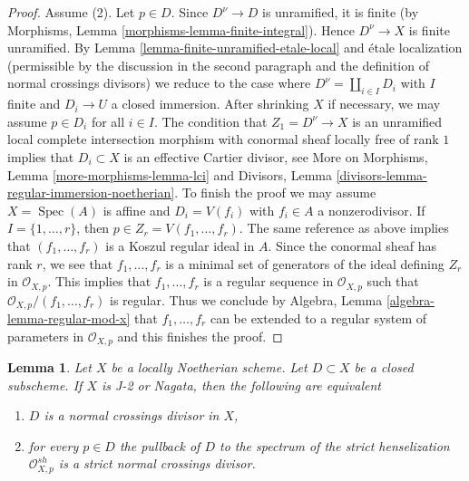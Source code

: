 \documentclass{stacks-project}
\theoremstyle{plain}
\newtheorem{lemma}[subsection]{Lemma}
\theoremstyle{definition}
\theoremstyle{remark}
\numberwithin{equation}{subsection}
\def\Spec{\mathop{\mathrm{Spec}}}
\begin{document}
\begin{proof}
\medskip\noindent
Assume (2). Let $p \in D$. Since $D^\nu \to D$ is unramified, it is
finite (by Morphisms, Lemma \ref{morphisms-lemma-finite-integral}).
Hence $D^\nu \to X$ is finite unramified.
By Lemma \ref{lemma-finite-unramified-etale-local}
and \'etale localization (permissible by the discussion
in the second paragraph and the definition of normal
crossings divisors) we reduce to the case where
$D^\nu = \coprod_{i \in I} D_i$
with $I$ finite and $D_i \to U$ a closed immersion.
After shrinking $X$ if necessary, we may assume
$p \in D_i$ for all $i \in I$. The condition that $Z_1 =  D^\nu \to X$ is an
unramified local complete intersection morphism
with conormal sheaf locally free of rank $1$
implies that $D_i \subset X$ is an effective Cartier divisor, see
More on Morphisms, Lemma \ref{more-morphisms-lemma-lci} and
Divisors, Lemma \ref{divisors-lemma-regular-immersion-noetherian}.
To finish the proof we may assume $X = \Spec(A)$ is affine
and $D_i = V(f_i)$ with $f_i \in A$ a nonzerodivisor.
If $I = \{1, \ldots, r\}$, then $p \in Z_r = V(f_1, \ldots, f_r)$.
The same reference as above implies that
$(f_1, \ldots, f_r)$ is a Koszul regular ideal in $A$.
Since the conormal sheaf has rank $r$, we see that
$f_1, \ldots, f_r$ is a minimal set of generators of
the ideal defining $Z_r$ in $\mathcal{O}_{X, p}$.
This implies that $f_1, \ldots, f_r$ is a regular sequence
in $\mathcal{O}_{X, p}$ such that $\mathcal{O}_{X, p}/(f_1, \ldots, f_r)$
is regular. Thus we conclude by
Algebra, Lemma \ref{algebra-lemma-regular-mod-x}
that $f_1, \ldots, f_r$ can be extended to a regular system of parameters
in $\mathcal{O}_{X, p}$ and this finishes the proof.
\end{proof}

\begin{lemma}
\label{lemma-characterize-normal-crossings}
Let $X$ be a locally Noetherian scheme. Let $D \subset X$ be a closed
subscheme. If $X$ is J-2 or Nagata, then the following are equivalent
\begin{enumerate}
\item $D$ is a normal crossings divisor in $X$,
\item for every $p \in D$ the pullback of $D$ to the spectrum of the
strict henselization $\mathcal{O}_{X, p}^{sh}$
is a strict normal crossings divisor.
\end{enumerate}
\end{lemma}
\end{document}
